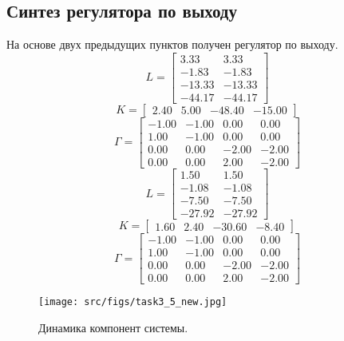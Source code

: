 \subsection{Синтез регулятора по выходу}
На основе двух предыдущих пунктов получен регулятор по выходу.
\[L = \begin{bmatrix}
        3.33 &  3.33\\
       -1.83 & -1.83\\
       -13.33 & -13.33\\
       -44.17 & -44.17
      \end{bmatrix}\]
      \[K = \begin{bmatrix}
        2.40 &  5.00 & -48.40 & -15.00
      \end{bmatrix}\]
      \[\Gamma = \begin{bmatrix}
       -1.00 & -1.00 &  0.00 &  0.00\\
        1.00 & -1.00 &  0.00 &  0.00\\
        0.00 &  0.00 & -2.00 & -2.00\\
        0.00 &  0.00 &  2.00 & -2.00
      \end{bmatrix}\]
      \[L = \begin{bmatrix}
        1.50 &  1.50\\
       -1.08 & -1.08\\
       -7.50 & -7.50\\
       -27.92 & -27.92
      \end{bmatrix}\]
      \[K = \begin{bmatrix}
        1.60 &  2.40 & -30.60 & -8.40
      \end{bmatrix}\]
      \[\Gamma = \begin{bmatrix}
       -1.00 & -1.00 &  0.00 &  0.00\\
        1.00 & -1.00 &  0.00 &  0.00\\
        0.00 &  0.00 & -2.00 & -2.00\\
        0.00 &  0.00 &  2.00 & -2.00
      \end{bmatrix}\]
      
      \begin{figure}[ht!]
        \centering
        \texttt{[image: src/figs/task3\_5\_new.jpg]}
        \caption{Динамика компонент системы.}
        \label{fig:task3_5.jpg}
\end{figure}

\FloatBarrier